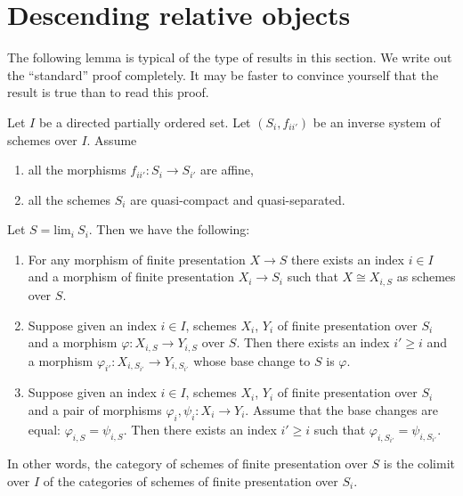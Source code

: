 \section{Descending relative objects}
\label{section-descending-relative}

\noindent
The following lemma is typical of the type of results in this section.
We write out the ``standard'' proof completely. It may be faster to
convince yourself that the result is true than to read this proof.

\begin{lemma}
\label{lemma-descend-finite-presentation}
Let $I$ be a directed partially ordered set.
Let $(S_i, f_{ii'})$ be an inverse system of schemes over $I$.
Assume
\begin{enumerate}
\item all the morphisms $f_{ii'} : S_i \to S_{i'}$ are affine,
\item all the schemes $S_i$ are quasi-compact and quasi-separated.
\end{enumerate}
Let $S = \text{lim}_i\ S_i$. Then we have the following:
\begin{enumerate}
\item For any morphism of finite presentation $X \to S$
there exists an index $i \in I$ and a morphism of finite
presentation $X_i \to S_i$ such that $X \cong X_{i, S}$ as
schemes over $S$.
\item Suppose given an index $i \in I$, schemes
$X_i$, $Y_i$ of finite presentation over $S_i$ and a morphism
$\varphi : X_{i, S} \to Y_{i, S}$ over $S$. Then there exists an index
$i' \geq i$ and a morphism
$\varphi_{i'} : X_{i, S_{i'}} \to Y_{i, S_{i'}}$
whose base change to $S$ is $\varphi$.
\item Suppose given an index $i \in I$, schemes
$X_i$, $Y_i$ of finite presentation over $S_i$ and a pair of morphisms
$\varphi_i, \psi_i : X_i \to Y_i$.
Assume that the base changes are equal: $\varphi_{i, S} = \psi_{i, S}$.
Then there exists an index $i' \geq i$ such that
$\varphi_{i, S_{i'}} = \psi_{i, S_{i'}}$.
\end{enumerate}
In other words, the category of schemes of finite presentation over
$S$ is the colimit over $I$ of the categories of schemes of finite
presentation over $S_i$.
\end{lemma}

